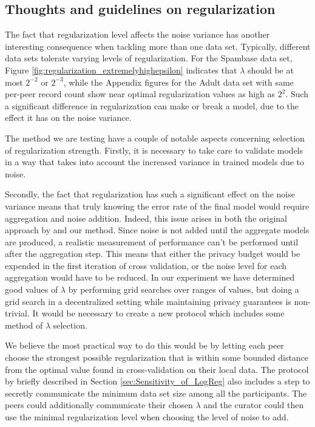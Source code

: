 \subsection{Thoughts and guidelines on regularization}
\label{sec:reg_thoughts_guidelines}
The fact that regularization level affects the noise variance has another interesting consequence when tackling more than one data set. Typically, different data sets tolerate varying levels of regularization. For the Spambase data set, Figure \ref{fig:regularization_extremelyhighepsilon} indicates that $\lambda$ should be at most $2^{-2}$ or $2^{-3}$, while the Appendix figures for the Adult data set with same per-peer record count show near optimal regularization values as high as $2^2$. Such a significant difference in regularization can make or break a model, due to the effect it has on the noise variance.

The method we are testing have a couple of notable aspects concerning selection of regularization strength. Firstly, it is necessary to take care to validate models in a way that takes into account the increased variance in trained models due to noise.

Secondly, the fact that regularization has such a significant effect on the noise variance means that truly knowing the error rate of the final model would require aggregation and noise addition. Indeed, this issue arises in both the original approach by \cite{pathak2010diffprivhomo} and our method. Since noise is not added until the aggregate models are produced, a realistic measurement of performance can't be performed until after the aggregation step. This means that either the privacy budget would be expended in the first iteration of cross validation, or the noise level for each aggregation would have to be reduced. In our experiment we have determined good values of $\lambda$ by performing grid searches over ranges of values, but doing a grid search in a decentralized setting while maintaining privacy guarantees is non-trivial. It would be necessary to create a new protocol which includes some method of $\lambda$ selection. 

We believe the most practical way to do this would be by letting each peer choose the strongest possible regularization that is within some bounded distance from the optimal value found in cross-validation on their local data. The protocol by \cite{pathak2010diffprivhomo} briefly described in Section \ref{sec:Sensitivity_of_LogReg} also includes a step to secretly communicate the minimum data set size among all the participants. The peers could additionally communicate their chosen $\lambda$ and the curator could then use the minimal regularization level when choosing the level of noise to add.

